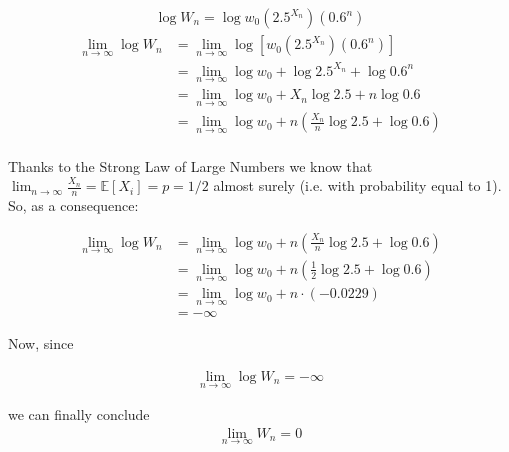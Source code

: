 \documentclass[12pt]{article}
\begin{document}
\begin{align}
    \begin{equation*}
        \log{W_n} = \log{w_0 \left(2.5^{X_n}\right) \left(0.6^{n}\right)}
  \end{equation*}    
\end{align}
\begin{equation*}
  \begin{split}
     \lim_{n\to\infty} \log{W_n} &= \lim_{n\to\infty} \log{\left[w_0 \left(2.5^{X_n}\right) \left(0.6^{n}\right)\right]}\\
    &= \lim_{n\to\infty} \log{w_0} + \log{2.5^{X_n}} + \log{0.6^{n}}\\
    &= \lim_{n\to\infty} \log{w_0} + X_n \log{2.5} + n \log{0.6}\\
    &= \lim_{n\to\infty} \log{w_0} + n (\tfrac{X_n}{n} \log{2.5} + \log{0.6})\\
  \end{split}
\end{equation*}

Thanks to the Strong Law of Large Numbers we know that $\lim_{n\to\infty}{\tfrac{X_n}{n} = \mathbb{E}[X_i] = p = 1/2}$ almost surely (i.e. with probability equal to 1). So, as a consequence:

\begin{equation*}
  \begin{split}
      \lim_{n\to\infty} \log{W_n} &= \lim_{n\to\infty} \log{w_0} + n (\tfrac{X_n}{n} \log{2.5} + \log{0.6}) \\
      &= \lim_{n\to\infty} \log{w_0} + n (\tfrac{1}{2} \log{2.5} + \log{0.6}) \\
      &= \lim_{n\to\infty} \log{w_0} + n \cdot(-0.0229) \\
      &= -\infty
  \end{split}
\end{equation*}

Now, since

\begin{align*}
    \begin{equation*}
        \lim_{n\to\infty} \log{W_n} = -\infty
    \end{equation*}    
\end{align*}

we can finally conclude
\begin{align}
    \begin{equation*}
        \lim_{n\to\infty} {W_n} = 0
    \end{equation*}    
\end{align}
\end{document}
